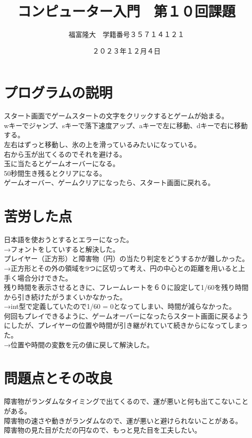 \documentclass{jsarticle}
\title{コンピューター入門　第１０回課題}
\author{福富隆大　学籍番号３５７１４１２１}
\date{２０２３年１２月４日}
\begin{document}
\maketitle
\section{プログラムの説明}
スタート画面でゲームスタートの文字をクリックするとゲームが始まる。\\
wキーでジャンプ、sキーで落下速度アップ、aキーで左に移動、dキーで右に移動する。\\
左右はずっと移動し、氷の上を滑っているみたいになっている。\\
右から玉が出てくるのでそれを避ける。\\
玉に当たるとゲームオーバーになる。\\
50秒間生き残るとクリアになる。\\
ゲームオーバー、ゲームクリアになったら、スタート画面に戻れる。\\
\section{苦労した点}
日本語を使おうとするとエラーになった。\\
→フォントをしていすると解決した。\\
プレイヤー（正方形）と障害物（円）の当たり判定をどうするかが難しかった。\\
→正方形とその外の領域を9つに区切って考え、円の中心との距離を用いると上手く場合分けできた。\\
残り時間を表示させるときに、フレームレートを６０に設定して1/60を残り時間から引き続けたがうまくいかなかった。 \\
→int型で定義していたので1/60 = 0となってしまい、時間が減らなかった。\\
何回もプレイできるように、ゲームオーバーになったらスタート画面に戻るようにしたが、プレイヤーの位置や時間が引き継がれていて続きからになってしまった。 \\
→位置や時間の変数を元の値に戻して解決した。\\
\section{問題点とその改良}
障害物がランダムなタイミングで出てくるので、運が悪いと何も出てこないことがある。
\\
障害物の速さや動きがランダムなので、運が悪いと避けられないことがある。\\
障害物の見た目がただの円なので、もっと見た目を工夫したい。\\
\end{document}
